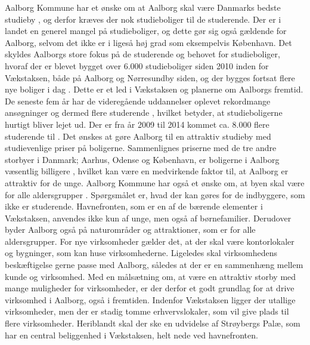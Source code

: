 \newline
\newline
Aalborg Kommune har et ønske om at Aalborg skal være Danmarks bedste studieby \citep{ungdom}, og derfor kræves der nok studieboliger til de studerende. Der er i landet en generel mangel på studieboliger, og dette gør sig også gældende for Aalborg, selvom det ikke er i ligeså høj grad som eksempelvis København. Det skyldes Aalborgs store fokus på de studerende og behovet for studieboliger, hvoraf der er blevet bygget over 6.000 studieboliger siden 2010 inden for Vækstaksen, både på Aalborg og Nørresundby siden, og der bygges fortsat flere nye boliger i dag \citep{studieboliger}. Dette er et led i Vækstaksen og planerne om Aalborgs fremtid. De seneste fem år har de videregående uddannelser oplevet rekordmange ansøgninger og dermed flere studerende \citep{uddannelser}, hvilket betyder, at studieboligerne hurtigt bliver lejet ud. Der er fra år 2009 til 2014 kommet ca. 8.000 flere studerende til \citep[ s. 9]{unital}. Det ønskes at gøre Aalborg til en attraktiv studieby med studievenlige priser på boligerne. Sammenlignes priserne med de tre andre storbyer i Danmark; Aarhus, Odense og København, er boligerne i Aalborg væsentlig billigere \citep{home}, hvilket kan være en medvirkende faktor til, at Aalborg er attraktiv for de unge.
\newline
\newline
Aalborg Kommune har også et ønske om, at byen skal være for alle aldersgrupper \citep{kl} \citep{kommuneplan3}. Spørgsmålet er, hvad der kan gøres for de indbyggere, som ikke er studerende. Havnefronten, som er en af de bærende elementer i Vækstaksen, anvendes ikke kun af unge, men også af børnefamilier. Derudover byder Aalborg også på naturområder og attraktioner, som er for alle aldersgrupper.
\newline
\newline
For nye virksomheder gælder det, at der skal være kontorlokaler og bygninger, som kan huse virksomhederne. Ligeledes skal virksomhedens beskæftigelse gerne passe med Aalborg, således at der er en sammenhæng mellem kunde og virksomhed. Med en målsætning om, at være en attraktiv storby med mange muligheder for virksomheder, er der derfor et godt grundlag for at drive virksomhed i Aalborg, også i fremtiden. Indenfor Vækstaksen ligger der utallige virksomheder, men der er stadig tomme erhvervslokaler, som vil give plads til flere virksomheder. Heriblandt skal der ske en udvidelse af Strøybergs Palæ, som har en central beliggenhed i Vækstaksen, helt nede ved havnefronten.

